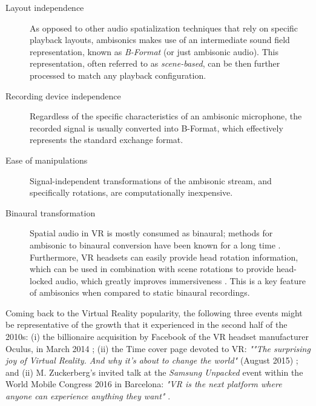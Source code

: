 \begin{description}

  \item [Layout independence] As opposed to other audio spatialization techniques that rely on specific playback layouts, ambisonics makes use of an intermediate sound field representation, known as \textit{B-Format} (or just ambisonic audio). This representation, often referred to as \textit{scene-based}, can be then further processed to match any playback configuration. 

  \item [Recording device independence] Regardless of the specific characteristics of an ambisonic microphone, the recorded signal is usually converted into B-Format, which effectively represents the standard exchange format. 

  \item [Ease of manipulations] Signal-independent transformations of the ambisonic stream, and specifically rotations, are computationally inexpensive.

  \item [Binaural transformation] Spatial audio in VR is mostly consumed as binaural; methods for ambisonic to binaural conversion have been known for a long time . Furthermore, VR headsets can easily provide head rotation information, which can be used in combination with scene rotations to provide head-locked audio, which greatly improves immersiveness . This is a key feature of ambisonics when compared to static binaural recordings.

\end{description}

Coming back to the Virtual Reality popularity, the following three events might be representative of the growth that it experienced in the second half of the 2010s: 
(i) the billionaire acquisition by Facebook of the VR headset manufacturer Oculus, in March 2014 \cite{facebookoculus}; 
(ii) the Time cover page devoted to VR: \textit{""The surprising joy of Virtual Reality. And why it's about to change the world"} (August 2015) \cite{time};
and (ii) M. Zuckerberg's invited talk at the \textit{Samsung Unpacked} event within the World Mobile Congress 2016 in Barcelona: \textit{"VR is the next platform where anyone can experience anything they want"} \cite{bbcnews}.


